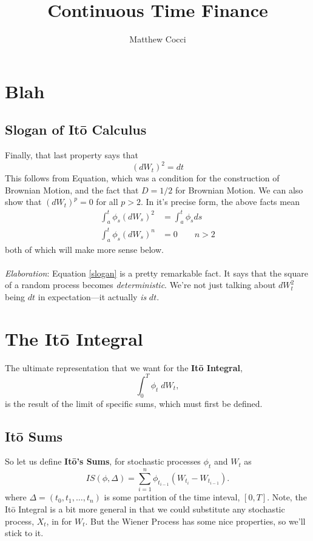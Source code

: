 \documentclass[a4paper,12pt]{scrartcl}
\title{Continuous Time Finance}
\author{Matthew Cocci}
\begin{document}
\maketitle

\tableofcontents

\newpage

\section{Blah}
\subsection{Slogan of It\={o} Calculus}
      
Finally, that last property says that
\begin{equation}
    \label{slogan}
     (dW_t)^2 = dt 
\end{equation}
This follows from Equation, which was a condition for
the construction of Brownian Motion, and the fact that $D=1/2$
for Brownian Motion. We can also show that $(dW_t)^p = 0$ for all $p>2$.
In it's precise form, the above facts mean
\begin{align*}
    \int^t_a \phi_s (dW_s)^2 &=  \int^t_a \phi_s ds \\
    \int^t_a \phi_s (dW_s)^n &= 0 \qquad n>2
\end{align*}
both of which will make more sense below.
\\
\\
{\sl Elaboration}: Equation \ref{slogan} is a pretty remarkable fact.
It says that the square of a random process becomes \emph{deterministic}.
We're not just talking about $dW^2_t$ being $dt$ in expectation---it 
actually \emph{is} $dt$.




\section{The It\={o} Integral}

The ultimate representation that we want for the \textbf{It\={o}
Integral}, 
   \[ \int_0^T \phi_t \;dW_t, \]
is the result of the limit of specific sums, which must first be defined.

\subsection{It\={o} Sums}

So let us define \textbf{It\={o}'s Sums}, for stochastic processes
$\phi_t$ and $W_t$ as
   \[ IS(\phi,\Delta)=\sum^n_{i=1} \phi_{t_{i-1}}(W_{t_i}-W_{t_{i-1}}).\]
where $\Delta = (t_0, t_1,\ldots,t_n)$ is some partition of the time 
inteval, $[0,T]$. Note, the It\={o} Integral 
is a bit more general in that we
could substitute any stochastic process, $X_t$, in for $W_t$.  But 
the Wiener Process has some nice properties, so we'll stick to it.
\end{document}
